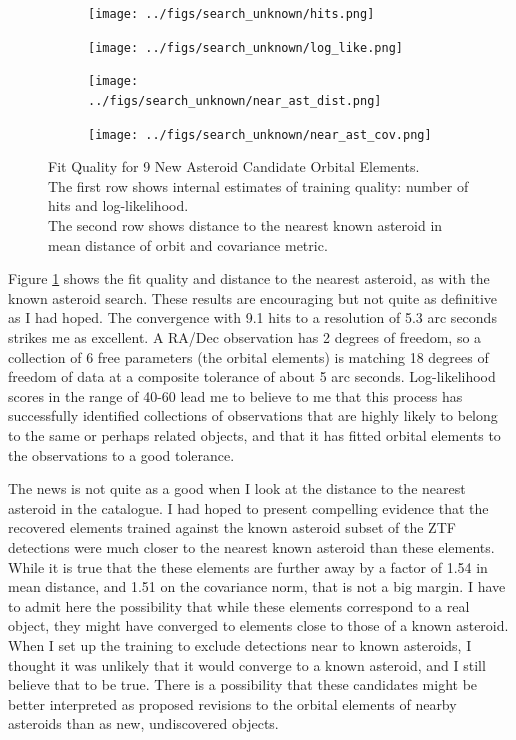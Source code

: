 \begin{figure}[h]
\begin{subfigure}[t]{\subfigwidth\textwidth}
\centering
\texttt{[image: ../figs/search\_unknown/hits.png]}
\end{subfigure}
\hfill
\begin{subfigure}[t]{\subfigwidth\textwidth}
\centering
\texttt{[image: ../figs/search\_unknown/log\_like.png]}
\end{subfigure}
\medskip
\begin{subfigure}[t]{\subfigwidth\textwidth}
\centering
\texttt{[image: ../figs/search\_unknown/near\_ast\_dist.png]}
\end{subfigure}
\hfill
\begin{subfigure}[t]{\subfigwidth\textwidth}
\centering
\texttt{[image: ../figs/search\_unknown/near\_ast\_cov.png]}
\end{subfigure}
\caption[Fit Quality for 9 New Asteroid Candidate Orbital Elements]
{Fit Quality for 9 New Asteroid Candidate Orbital Elements.\\
The first row shows internal estimates of training quality: number of hits and log-likelihood.\\
The second row shows distance to the nearest known asteroid in mean distance of orbit and covariance metric.}
\label{fig:TrainUnknown}
\end{figure}

Figure \ref{fig:TrainUnknown} shows the fit quality and distance to the nearest asteroid, as with the known asteroid search.
These results are encouraging but not quite as definitive as I had hoped.
The convergence with 9.1 hits to a resolution of 5.3 arc seconds strikes me as excellent.
A RA/Dec observation has 2 degrees of freedom, so a collection of 6 free parameters (the orbital elements)
is matching 18 degrees of freedom of data at a composite tolerance of about 5 arc seconds.
Log-likelihood scores in the range of 40-60 lead me to believe to me that this process 
has successfully identified collections of observations that are highly likely to belong to the same or perhaps related objects,
and that it has fitted orbital elements to the observations to a good tolerance.

The news is not quite as a good when I look at the distance to the nearest asteroid in the catalogue.
I had hoped to present compelling evidence that the recovered elements trained against the
known asteroid subset of the ZTF detections were much closer to the nearest known asteroid than these elements.
While it is true that the these elements are further away by a factor of 1.54 in mean distance,
and 1.51 on the covariance norm, that is not a big margin.
I have to admit here the possibility that while these elements correspond to a real object,
they might have converged to elements close to those of a known asteroid.
When I set up the training to exclude detections near to known asteroids,
I thought it was unlikely that it would converge to a known asteroid, and I still believe that to be true.
There is a possibility that these candidates might be better interpreted as proposed revisions to the
orbital elements of nearby asteroids than as new, undiscovered objects.

